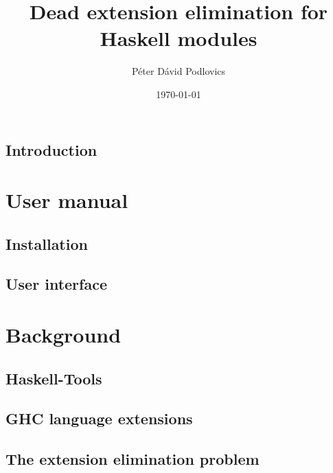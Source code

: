 \documentclass[12pt,a4paper,twoside]{report}
\title{Dead extension elimination for Haskell modules}
\date{\today}
\author{Péter Dávid Podlovics}
\begin{document}
	
	
	
	\setcounter{tocdepth}{0}
	\begin{spacing}{0.1}
		\tableofcontents
	\end{spacing}
	
	\chapter{Introduction}
	
	
	\part*{User manual}
		\chapter{Installation}
		
		
		\chapter{User interface}
		
	
	\part*{Background}
		\chapter{Haskell-Tools} \label{haskell-tools}
		
		
		\chapter{GHC language extensions} \label{ghc-exts}
		
		
		\chapter{The extension elimination problem}
		
		
\end{document}
